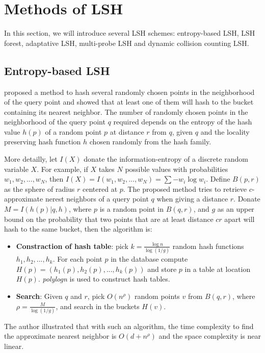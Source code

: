 \section{Methods of LSH}
In this section, we will introduce several LSH schemes: entropy-based LSH, LSH forest, adaptative LSH, multi-probe LSH and dynamic collision counting LSH.

\subsection{Entropy-based LSH}
\cite{panigrahy2006entropy} proposed a method to hash several randomly chosen points in the neighborhood of the query point and showed that at least one of them will hash to the bucket containing its nearest neighbor. The number of randomly chosen points in the neighborhood of the query point $q$ required depends on the entropy of the hash value $h(p)$ of a random point $p$ at distance $r$ from $q$, given $q$ and the locality preserving hash function $h$ chosen randomly from the hash family.

More detailly, let $I(X)$ donate the information-entropy of a discrete random variable $X$. For example, if $X$ takes $N$ possible values with probabilities $w_1, w_2, ..., w_N$, then $I(X)=I(w_1, w_2, ..., w_N)=\sum -w_i\log w_i$. Define $B(p, r)$ as the sphere of radius $r$ centered at $p$. The proposed method tries to retrieve $c$-approximate nerest neighbors of a query point $q$ when giving a distance $r$. Donate $M=I(h(p)|q, h)$, where $p$ is a random point in $B(q, r)$, and $g$ as an upper bound on the probability that two points that are at least distance $cr$ apart will hash to the same bucket, then the algorithm is:
\begin{itemize}
	\item \textbf{Constraction of hash table}: pick $k=\frac{\log n}{\log (1/g)}$ random hash functions $h_1, h_2, ..., h_k$. For each point $p$ in the database compute $H(p)=(h_1(p), h_2(p), ..., h_k(p))$ and store $p$ in a table at location $H(p)$. \textit{polylogn} is used to construct hash tables.
	\item \textbf{Search}: Given $q$ and $r$, pick $O(n^\rho)$ random points $v$ from $B(q, r)$, where $\rho=\frac{M}{\log(1/g)}$, and search in the buckets $H(v)$.
\end{itemize}

The author illustrated that with such an algorithm, the time complexity to find the approximate nearest neighbor is $O(d+n^\rho)$ and the space complexity is near linear.
